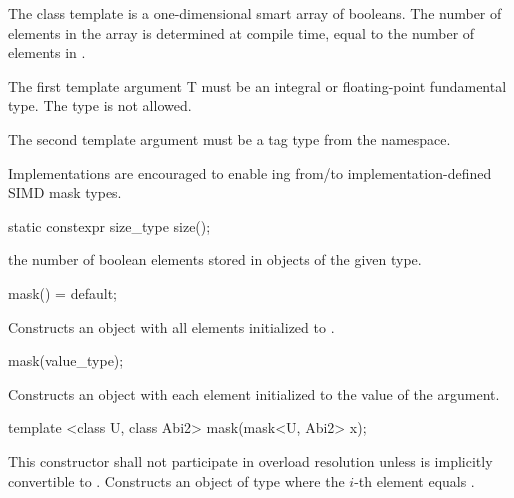 

\pnum The class template \mask[<T, Abi>] is a one-dimensional smart array of booleans.
The number of elements in the array is determined at compile time, equal to the number of elements in \datapar[<T, Abi>].

\pnum The first template argument \type T must be an integral or floating-point fundamental type.
The type \bool is not allowed.

\pnum The second template argument  must be a tag type from the  namespace.

\pnum\realnote Implementations are encouraged to enable ing from/to implementation-defined SIMD mask types.

\begin{itemdecl}
static constexpr size_type size();
\end{itemdecl}
\begin{itemdescr}
  \pnum\returns the number of boolean elements stored in objects of the given \mask[<T, Abi>] type.
\end{itemdescr}

\begin{itemdecl}
mask() = default;
\end{itemdecl}
\begin{itemdescr}
  \pnum\effects Constructs an object with all elements initialized to .
\end{itemdescr}

\begin{itemdecl}
mask(value_type);
\end{itemdecl}
\begin{itemdescr}
  \pnum\effects Constructs an object with each element initialized to the value of the argument.
\end{itemdescr}

\begin{itemdecl}
template <class U, class Abi2> mask(mask<U, Abi2> x);
\end{itemdecl}
\begin{itemdescr}
  \pnum\remarks This constructor shall not participate in overload resolution unless
    \datapar[<U, Abi2>] is implicitly convertible to \datapar[<T, Abi>].
  \pnum\effects Constructs an object of type \mask where the $i$-th element equals  \foralli.
\end{itemdescr}


